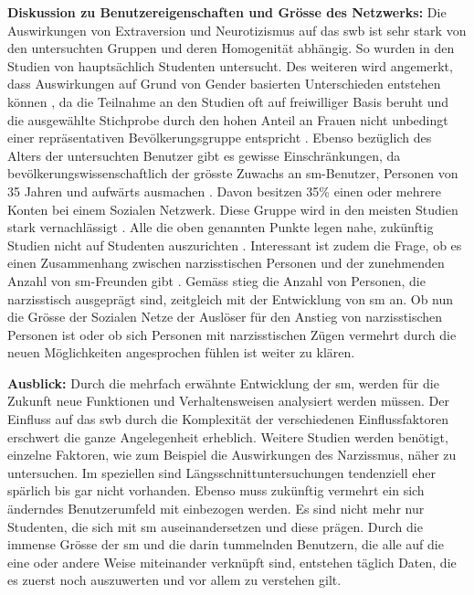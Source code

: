 \textbf{Diskussion zu Benutzereigenschaften und Grösse des Netzwerks:}\newline
Die Auswirkungen von Extraversion und Neurotizismus auf das \gls{swb} ist sehr stark von den untersuchten Gruppen und deren Homogenität abhängig. So wurden in den Studien von  hauptsächlich Studenten untersucht. Des weiteren wird angemerkt, dass Auswirkungen auf Grund von Gender basierten Unterschieden entstehen können \cite{Special:2012}, da die Teilnahme an den Studien oft auf freiwilliger Basis beruht und die ausgewählte Stichprobe durch den hohen Anteil an Frauen nicht unbedingt einer repräsentativen Bevölkerungsgruppe entspricht \cite{Manago:2012}. Ebenso bezüglich des Alters der untersuchten Benutzer gibt es gewisse Einschränkungen, da bevölkerungswissenschaftlich der grösste Zuwachs an \gls{sm}-Benutzer, Personen von 35 Jahren und aufwärts ausmachen \cite{Lenhart:2009}. Davon besitzen 35\%  einen oder mehrere Konten bei einem Sozialen Netzwerk. Diese Gruppe wird in den meisten Studien stark vernachlässigt \cite{Special:2012}. Alle die oben genannten Punkte legen nahe, zukünftig Studien nicht auf Studenten auszurichten \cite{Kim:2011}. Interessant ist zudem die Frage, ob es einen Zusammenhang zwischen narzisstischen Personen und der zunehmenden Anzahl von \gls{sm}-Freunden gibt \cite{Manago:2012}. Gemäss  stieg die Anzahl von Personen, die narzisstisch ausgeprägt sind, zeitgleich mit der Entwicklung von \gls{sm} an. Ob nun die Grösse der Sozialen Netze der Auslöser für den Anstieg von narzisstischen Personen ist \cite{Manago:2012} oder ob sich Personen mit narzisstischen Zügen vermehrt durch die neuen Möglichkeiten angesprochen fühlen \cite{Carpenter:2012} ist weiter zu klären. \par 
\textbf{Ausblick:}\newline
Durch die mehrfach erwähnte Entwicklung der \gls{sm}, werden für die Zukunft neue Funktionen und Verhaltensweisen analysiert werden müssen. Der Einfluss auf das \gls{swb} durch die Komplexität der verschiedenen Einflussfaktoren erschwert die ganze Angelegenheit erheblich. Weitere Studien werden benötigt, einzelne Faktoren, wie zum Beispiel die Auswirkungen des Narzissmus, näher zu untersuchen. Im speziellen sind Längsschnittuntersuchungen tendenziell eher spärlich bis gar nicht vorhanden. Ebenso muss zukünftig vermehrt ein sich änderndes Benutzerumfeld mit einbezogen werden. Es sind nicht mehr nur Studenten, die sich mit \gls{sm} auseinandersetzen und diese prägen.\newline
Durch die immense Grösse der \gls{sm} und die darin tummelnden Benutzern, die alle auf die eine oder andere Weise miteinander verknüpft sind, entstehen täglich Daten, die es zuerst noch auszuwerten und vor allem zu verstehen gilt.
